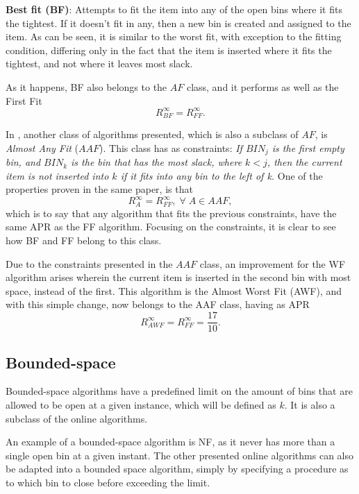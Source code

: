 \textbf{Best fit (BF)}: Attempts to fit the item into any of the open bins where
it fits the tightest. If it doesn't fit in any, then a new bin is created and
assigned to the item. As can be seen, it is similar to the worst fit, with
exception to the fitting condition, differing only in the fact that the item is
inserted where it fits the tightest, and not where it leaves most slack.

As it happens, BF also belongs to the $AF$ class, and it performs as well as the
First Fit
\begin{equation}
    R_{BF}^\infty = R_{FF}^\infty.
\end{equation}

In \cite{johnson1974fast}, another class of algorithms presented, which is
also a subclass of $AF$, is \textit{Almost Any Fit} ($AAF$). This class has as
constraints: \textit{If $BIN_j$ is the first empty bin, and $BIN_k$ is the bin
that has the most slack, where $k < j$, then the current item is not inserted
into $k$ if it fits into any bin to the left of k.} One of the properties proven
in the same paper, is that 
\begin{equation}
    R_A^\infty = R_{FF}^\infty, \; \forall \; A \in AAF,
\end{equation}
which is to say that any algorithm that fits the previous constraints, have the
same APR as the FF algorithm. Focusing on the constraints, it is clear to see
how BF and FF belong to this class. 

Due to the constraints presented in the $AAF$ class, an improvement for the WF
algorithm arises wherein the current item is inserted in the second bin with
most space, instead of the first. This algorithm is the Almost Worst Fit (AWF),
and with this simple change, now belongs to the AAF class, having as APR
\begin{equation}
    R_{AWF}^\infty = R_{FF}^\infty = \frac{17}{10}.
\end{equation}

\subsection{Bounded-space} 

Bounded-space algorithms have a predefined limit on the amount of bins that are
allowed to be open at a given instance, which will be defined as $k$. It is also
a subclass of the online algorithms.

An example of a bounded-space algorithm is NF, as it never has more than a
single open bin at a given instant. The other presented online algorithms can
also be adapted into a bounded space algorithm, simply by specifying a procedure
as to which bin to close before exceeding the limit.

